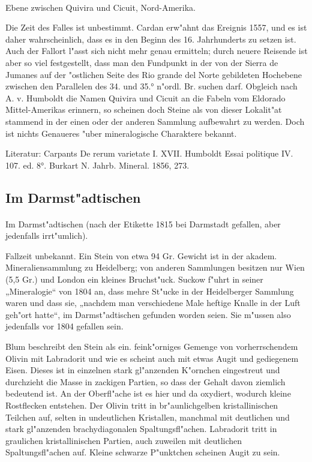 \documentclass[a4paper, 11pt, oneside]{article}
\begin{document}
\paragraph{}
Ebene zwischen Quivira und Cicuit, Nord-Amerika.

Die Zeit des Falles ist unbestimmt. Cardan erw"ahnt das Ereignis 1557, und es ist daher wahrscheinlich, dass es in den Beginn des 16. Jahrhunderts zu setzen ist. Auch der Fallort l"asst sich nicht mehr genau ermitteln; durch neuere Reisende ist aber so viel festgestellt, dass man den Fundpunkt in der von der Sierra de Jumanes auf der "ostlichen Seite des Rio grande del Norte gebildeten Hochebene zwischen den Parallelen des 34. und 35.° n"ordl. Br. suchen darf. Obgleich nach A. v. Humboldt die Namen Quivira und Cicuit an die Fabeln vom Eldorado Mittel-Amerikas erinnern, so scheinen doch Steine als von dieser Lokalit"at stammend in der einen oder der anderen Sammlung aufbewahrt zu werden. Doch ist nichts Genaueres "uber mineralogische Charaktere bekannt.

Literatur: Carpants De rerum varietate I. XVII. Humboldt Essai politique IV. 107. ed. 8°. Burkart N. Jahrb. Mineral. 1856, 273.

\subsection{Im Darmst"adtischen}
\normalsize
\paragraph{}
Im Darmst"adtischen (nach der Etikette 1815 bei Darmstadt gefallen, aber jedenfalls irrt"umlich).

Fallzeit unbekannt. Ein Stein von etwa 94 Gr. Gewicht ist in der akadem. Mineraliensammlung zu Heidelberg; von anderen Sammlungen besitzen nur Wien (5,5 Gr.) und London ein kleines Bruchst"uck. Suckow f"uhrt in seiner „Mineralogie“ von 1804 an, dass mehre St"ucke in der Heidelberger Sammlung waren und dass sie, „nachdem man verschiedene Male heftige Knalle in der Luft geh"ort hatte“, im Darmst"adtischen gefunden worden seien. Sie m"ussen also jedenfalls vor 1804 gefallen sein.

Blum beschreibt den Stein als ein. feink"orniges Gemenge von vorherrschendem Olivin mit Labradorit und wie es scheint auch mit etwas Augit und gediegenem Eisen. Dieses ist in einzelnen stark gl"anzenden K"ornchen eingestreut und durchzieht die Masse in zackigen Partien, so dass der Gehalt davon ziemlich bedeutend ist. An der Oberfl"ache ist es hier und da oxydiert, wodurch kleine Rostflecken entstehen. Der Olivin tritt in br"aunlichgelben kristallinischen Teilchen auf, selten in undeutlichen Kristallen, manchmal mit deutlichen und stark gl"anzenden brachydiagonalen Spaltungsfl"achen. Labradorit tritt in graulichen kristallinischen Partien, auch zuweilen mit deutlichen Spaltungsfl"achen auf. Kleine schwarze P"unktchen scheinen Augit zu sein.
\end{document}
